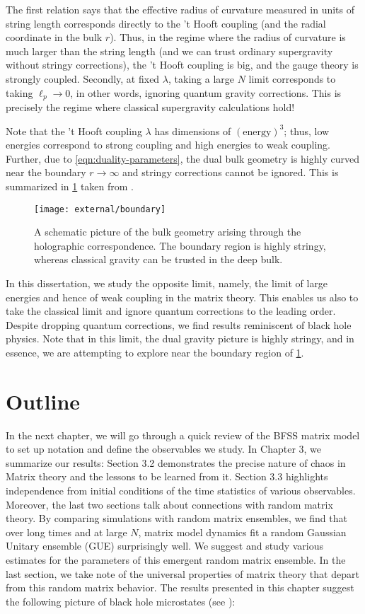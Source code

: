 The first relation says that the effective radius of curvature measured in units of string length corresponds directly to the 't Hooft coupling (and the radial coordinate in the bulk $r$). Thus, in the regime where the radius of curvature is much larger than the string length (and we can trust ordinary supergravity without stringy corrections), the 't Hooft coupling is big, and the gauge theory is strongly coupled. Secondly, at fixed $\lambda$, taking a large $N$ limit corresponds to taking $\ell_p \to 0$, in other words, ignoring quantum gravity corrections. This is precisely the regime where classical supergravity calculations hold!

Note that the 't Hooft coupling $\lambda$ has dimensions of $(\mathrm{energy})^3$; thus, low energies correspond to strong coupling and high energies to weak coupling. Further, due to \cref{eqn:duality-parameters}, the dual bulk geometry is highly curved near the boundary $r \to \infty$ and stringy corrections cannot be ignored. This is summarized in \cref{fig:boundary} taken from \cite{Maldacena:2018vsr}.

\begin{figure}[H]
  \centering
  \texttt{[image: external/boundary]}
  \caption{A schematic picture of the bulk geometry arising through the holographic correspondence. The boundary region is highly stringy, whereas classical gravity can be trusted in the deep bulk.}
  \label{fig:boundary}
\end{figure}

In this dissertation, we study the opposite limit, namely, the limit of large energies and hence of weak coupling in the matrix theory. This enables us also to take the classical limit and ignore quantum corrections to the leading order. Despite dropping quantum corrections, we find results reminiscent of black hole physics. Note that in this limit, the dual gravity picture is highly stringy, and in essence, we are attempting to explore near the boundary region of \cref{fig:boundary}.


\section{Outline}

In the next chapter, we will go through a quick review of the BFSS matrix model to set up notation and define the observables we study. In Chapter 3, we summarize our results: Section 3.2 demonstrates the precise nature of chaos in Matrix theory and the lessons to be learned from it. Section 3.3 highlights independence from initial conditions of the time statistics of various observables. Moreover, the last two sections talk about connections with random matrix theory. By comparing simulations with random matrix ensembles, we find that over long times and at large $N$, matrix model dynamics fit a random Gaussian Unitary ensemble (GUE) surprisingly well. We suggest and study various estimates for the parameters of this emergent random matrix ensemble. In the last section, we take note of the universal properties of matrix theory that depart from this random matrix behavior. The results presented in this chapter suggest the following picture of black hole microstates (see \cite{Susskind:1993ws,Horowitz:1996nw}):

